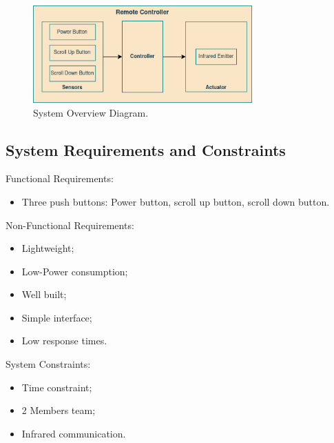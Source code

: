 \documentclass[12pt, letterpaper]{report}
\begin{document}
\begin{figure}[ht]
	\centering
	\includegraphics[width=0.75\textwidth]{SysOverview}
	\caption{System Overview Diagram.}
	\label{fig:sys_overview}
\end{figure}

\subsection{System Requirements and Constraints}

Functional Requirements:

\begin{itemize}
	\item Three push buttons: Power button, scroll up button, scroll down button.
\end{itemize}

Non-Functional Requirements:
\begin{itemize}
	\item Lightweight;
	\item Low-Power consumption;
	\item Well built;
	\item Simple interface;
	\item Low response times.
\end{itemize}

System Constraints:
\begin{itemize}
	\item Time constraint;
	\item 2 Members team;
	\item Infrared communication.
\end{itemize}
\end{document}

